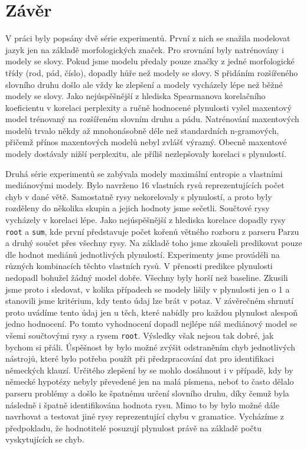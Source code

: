 \documentclass[12pt,a4paper]{report}
\def\chapwithtoc#1{
\chapter*{#1}
\addcontentsline{toc}{chapter}{#1}
}
\begin{document}
% 

\chapwithtoc{Závěr}
V práci byly popsány dvě série experimentů. První z nich se snažila modelovat jazyk jen na základě morfologických značek. Pro srovnání byly natrénovány i modely se slovy. Pokud jsme modelu předaly pouze značky z jedné morfologické třídy (rod, pád, číslo), dopadly hůře než modely se slovy. S přidáním rozšířeného slovního druhu došlo ale vždy ke zlepšení a modely vycházely lépe než běžné modely se slovy. Jako nejúspěšnější z hlediska Spearmanova korelačního koeficientu v korelaci perplexity a ručně hodnocené plynulosti vyšel maxentový model trénovaný na rozšířeném slovním druhu a pádu. Natrénování maxentových modelů trvalo někdy až mnohonásobně déle než standardních n-gramových, přičemž přínos maxentových modelů nebyl zvlášť výrazný. Obecně maxentové modely dostávaly nižší perplexitu, ale příliš nezlepšovaly korelaci s plynulostí.

Druhá série experimentů se zabývala modely maximální entropie a vlastními mediánovými modely. Bylo navrženo 16 vlastních rysů reprezentujících počet chyb v dané větě. Samostatně rysy nekorelovaly s plynulostí, a proto byly rozděleny do několika skupin a jejich hodnoty jsme sečetli. Součtové rysy vycházely v korelaci lépe. Jako nejúspěšnější z hlediska korelace dopadly rysy \texttt{root} a \texttt{sum}, kde první představuje počet kořenů větného rozboru z parseru Parzu a druhý součet přes všechny rysy. Na základě toho jsme zkoušeli predikovat pouze dle hodnot mediánů jednotlivých plynulostí. Experimenty jsme prováděli na různých kombinacích těchto vlastních rysů. V přenosti predikce plynulosti nedopadl bohužel žádný model dobře. Všechny byly horší než baseline. Zkusili jsme proto i sledovat, v kolika případech se modely lišily v plynulosti jen o 1 a stanovili jsme kritérium, kdy tento údaj lze brát v potaz. V závěrečném shrnutí proto uvádíme tento údaj jen u těch, které nabídly pro každou plynulost alespoň jedno hodnocení. Po tomto vyhodnocení dopadl nejlépe náš mediánový model se všemi součtovými rysy a rysem \texttt{root}. Výsledky však nejsou tak dobré, jak bychom si přáli. Úspěšnost by bylo možné zvýšit odstraněním chyb jednotlivých nástrojů, které bylo potřeba použít při předzpracování dat pro identifikaci německých klauzí. Určitého zlepšení by se mohlo dosáhnout i v případě, kdy by německé hypotézy nebyly převedené jen na malá písmena, neboť to často dělalo parseru problémy a došlo ke špatnému určení slovního druhu, díky čemuž byla následně i špatně identifikována hodnota rysu. Mimo to by bylo možné dále navrhovat a testovat jiné rysy reprezentující chybu v gramatice. Vycházíme z předpokladu, že hodnotitelé posuzují plynulost právě na základě počtu vyskytujících se chyb.
\end{document}
